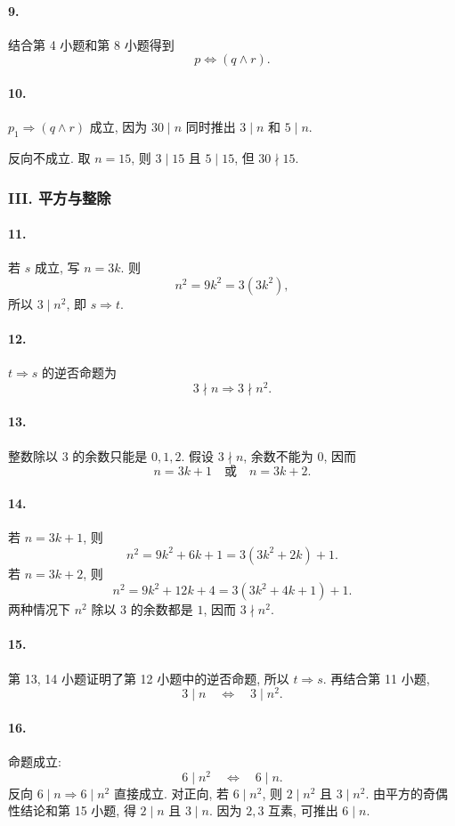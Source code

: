 \documentclass[usesamecnt, thmcnt=section, lang=cn, newtx, 10pt, scheme=chinese]{elegantbook}
\begin{document}
\paragraph*{9.}
结合第 4 小题和第 8 小题得到
\[
 p\Leftrightarrow(q\wedge r).
\]

\paragraph*{10.}
$p_1\Rightarrow(q\wedge r)$ 成立, 因为 $30\mid n$ 同时推出 $3\mid n$ 和 $5\mid n$.

反向不成立. 取 $n=15$, 则 $3\mid15$ 且 $5\mid15$, 但 $30\nmid15$.

\subsubsection*{III. 平方与整除}

\paragraph*{11.}
若 $s$ 成立, 写 $n=3k$. 则
\[
 n^2=9k^2=3(3k^2),
\]
所以 $3\mid n^2$, 即 $s\Rightarrow t$.

\paragraph*{12.}
$t\Rightarrow s$ 的逆否命题为
\[
 3\nmid n\Rightarrow3\nmid n^2.
\]

\paragraph*{13.}
整数除以 $3$ 的余数只能是 $0,1,2$. 假设 $3\nmid n$, 余数不能为 $0$, 因而
\[
 n=3k+1\quad\text{或}\quad n=3k+2.
\]

\paragraph*{14.}
若 $n=3k+1$, 则
\[
 n^2=9k^2+6k+1=3(3k^2+2k)+1.
\]
若 $n=3k+2$, 则
\[
 n^2=9k^2+12k+4=3(3k^2+4k+1)+1.
\]
两种情况下 $n^2$ 除以 $3$ 的余数都是 $1$, 因而 $3\nmid n^2$.

\paragraph*{15.}
第 13, 14 小题证明了第 12 小题中的逆否命题, 所以 $t\Rightarrow s$. 再结合第 11 小题,
\[
 3\mid n\quad\Leftrightarrow\quad3\mid n^2.
\]

\paragraph*{16.}
命题成立:
\[
 6\mid n^2\quad\Leftrightarrow\quad6\mid n.
\]
反向 $6\mid n\Rightarrow6\mid n^2$ 直接成立. 对正向, 若 $6\mid n^2$, 则 $2\mid n^2$ 且 $3\mid n^2$. 由平方的奇偶性结论和第 15 小题, 得 $2\mid n$ 且 $3\mid n$. 因为 $2,3$ 互素, 可推出 $6\mid n$.
\end{document}
